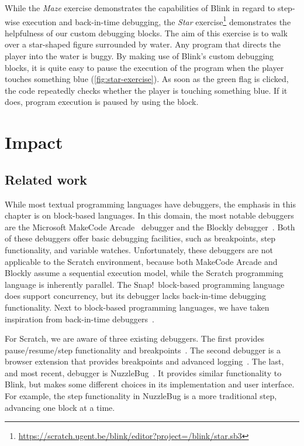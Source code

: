 \documentclass[../main]{subfiles}
\begin{document}
While the \emph{Maze} exercise demonstrates the capabilities of Blink in regard to step-wise execution and back-in-time debugging, the \emph{Star} exercise\footnote{\url{https://scratch.ugent.be/blink/editor?project=/blink/star.sb3}} demonstrates the helpfulness of our custom debugging blocks.
The aim of this exercise is to walk over a star-shaped figure surrounded by water.
Any program that directs the player into the water is buggy.
By making use of Blink's custom debugging blocks, it is quite easy to pause the execution of the program when the player touches something blue (\cref{fig:star-exercise}).
As soon as the green flag is clicked, the code repeatedly checks whether the player is touching something blue.
If it does, program execution is paused by using the  block.

\section{Impact}\label{sec:blink-impact}

\subsection{Related work}\label{subsec:related-work}
While most textual programming languages have debuggers, the emphasis in this chapter is on block-based languages.
In this domain, the most notable debuggers are the Microsoft MakeCode Arcade~\autocite{ballMicrosoftMakeCodeEmbedded2019} debugger and the Blockly debugger~\autocite{savidisCompleteBlockLevelVisual2020}.
Both of these debuggers offer basic debugging facilities, such as breakpoints, step functionality, and variable watches.
Unfortunately, these debuggers are not applicable to the Scratch environment, because both MakeCode Arcade and Blockly assume a sequential execution model, while the Scratch programming language is inherently parallel.
The Snap!\ block-based programming language~\autocite{monigSnapBuildYour2024} does support concurrency, but its debugger lacks back-in-time debugging functionality.
Next to block-based programming languages, we have taken inspiration from back-in-time debuggers~\autocite{barrTardisAffordableTimetravel2014,barrTimetravelDebuggingJavaScript2016}.

For Scratch, we are aware of three existing debuggers.
The first provides pause/resume/step functionality and breakpoints~\autocite{wangDevelopingResourcesDebugging2021}.
The second debugger is a browser extension that provides breakpoints and advanced logging~\autocite{ScratchAddons2023}.
The last, and most recent, debugger is NuzzleBug~\autocite{deinerNuzzleBugDebuggingBlockbased2023}.
It provides similar functionality to Blink, but makes some different choices in its implementation and user interface.
For example, the step functionality in NuzzleBug is a more traditional step, advancing one block at a time.
\end{document}
